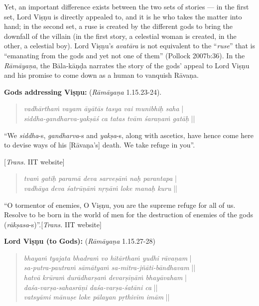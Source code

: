 Yet, an important difference exists between the two sets of stories --- in the first set, Lord Viṣṇu is directly appealed to, and it is he who takes the matter into hand; in the second set, a ruse is created by the different gods to bring the downfall of the villain (in the first story, a celestial woman is created, in the other, a celestial boy). Lord Viṣṇu’s {\sl avatāra} is not equivalent to the “{\sl ruse}” that is “emanating from the gods and yet not one of them” (Pollock 2007b:36). In the {\sl Rāmāyaṇa}, the Bāla-kāṇḍa narrates the story of the gods’ appeal to Lord Viṣṇu and his promise to come down as a human to vanquish Rāvaṇa. 

\smallskip
\textbf{Gods addressing Viṣṇu:} ({\sl Rāmāyaṇa} 1.15.23-24).\\[-20pt]
\begin{quote}
{{\sl vadhārthaṁ vayam āyātās\label{verse1} tasya vai munibhiḥ saha}} |\\
{\sl siddha-gandharva-yakṣāś ca tatas tvām śaraṇaṁ gatāḥ} ||
\end{quote}

\begin{myquote}
“We {\sl siddha}-s, {\sl gandharva}-s and {\sl yakṣa}-s, along with ascetics, have hence come here to devise ways of his [Rāvaṇa’s] death. We take refuge in you”.

\hfill[{\sl Trans.} IIT website]
\end{myquote}
\begin{quote}
{{\sl tvaṁ gatiḥ paramā deva\label{verse2} sarveṣāṁ naḥ parantapa}} |\\
{\sl vadhāya deva śatrūṇāṁ nṛṇāṁ loke manaḥ kuru} ||
\end{quote}

\begin{myquote}
“O tormentor of enemies, O Viṣṇu, you are the supreme refuge for all of us. Resolve to be born in the world of men for the destruction of enemies of the gods ({\sl rākṣasa}-s)”.\hfill [{\sl Trans.} IIT website]
\end{myquote}

\smallskip
\textbf{Lord Viṣṇu (to Gods):} ({\sl Rāmāyaṇa} 1.15.27-28)
\begin{quote}
{{\sl bhayaṁ tyajata bhadraṁ\label{verse3} vo hitārthaṁ yudhi rāvaṇam}} |\\
{\sl sa-putra-pautraṁ sāmātyaṁ sa-mitra-jñāti-bāndhavam} ||\\
{\sl hatvā krūraṁ durādharṣaṁ\label{verse4} devarṣīṇāṁ bhayāvaham} |\\
{\sl daśa-varṣa-sahasrāṇi daśa-varṣa-śatāni ca} ||\\
{\sl vatsyāmi mānuṣe loke pālayan pṛthivīm imām} ||
\end{quote}

